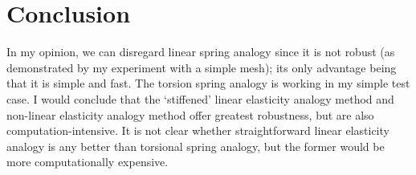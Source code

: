 \documentclass[letterpaper,twoside,11pt]{article}
\begin{document}
\section{Conclusion}
In my opinion, we can disregard linear spring analogy since it is not robust (as demonstrated by my experiment with a simple mesh); its only advantage being that it is simple and fast. The torsion spring analogy is working in my simple test case. I would conclude that the `stiffened' linear elasticity analogy method and non-linear elasticity analogy method offer greatest robustness, but are also computation-intensive. It is not clear whether straightforward linear elasticity analogy is any better than torsional spring analogy, but the former would be more computationally expensive.


\end{document}
